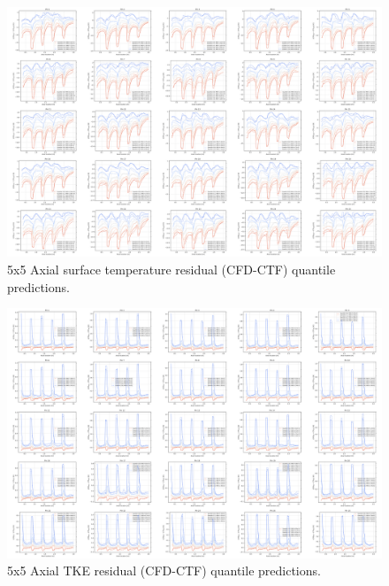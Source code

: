 \begin{landscape}
\begin{figure}[H]
    \centering
    \includegraphics[width=0.96\linewidth]{figs/ml_fit/q_twall_regression_montage_sm}
    \caption{5x5 Axial surface temperature residual (CFD-CTF)  quantile predictions.}
    \label{fig:qtwallregressionmontagesm}
\end{figure}

\begin{figure}[H]
    \centering
    \includegraphics[width=0.96\linewidth]{figs/ml_fit/q_tke_regression_montage_sm}
    \caption{5x5 Axial TKE residual (CFD-CTF) quantile predictions.}
    \label{fig:qtkeregressionmontagesm}
\end{figure}


\end{landscape}
